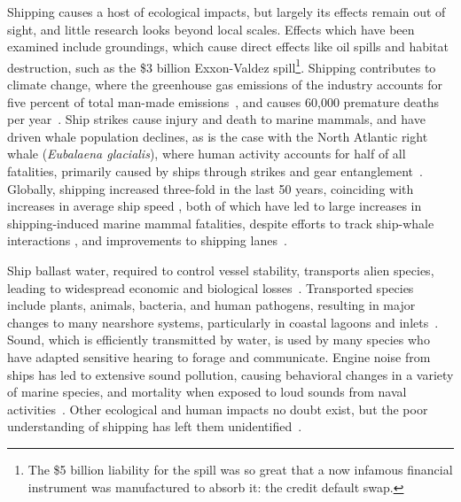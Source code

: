 Shipping causes a host of ecological impacts, but largely its effects remain out of sight, and little research looks beyond local scales. Effects which have been examined include groundings, which cause direct effects like oil spills and habitat destruction, such as the \$3 billion Exxon-Valdez spill\footnote{The \$5 billion liability for the spill was so great that a now infamous financial instrument was manufactured to absorb it: the credit default swap.}.  Shipping contributes to climate change, where the greenhouse gas emissions of the industry accounts for five percent of total man-made emissions~\citep{Eyring2009}, and causes 60,000 premature deaths per year~\citep{Corbett2007}.  Ship strikes cause injury and death to marine mammals, and have driven whale population declines, as is the case with the North Atlantic right whale (\textit{Eubalaena glacialis}), where human activity accounts for half of all fatalities, primarily caused by ships through strikes and gear entanglement~\citep{Moore2007}. Globally, shipping increased three-fold in the last 50 years, coinciding with increases in average ship speed \citep{Vanderlaan2009}, both of which have led to large increases in shipping-induced marine mammal fatalities, despite efforts to track ship-whale interactions \citep{jensen2004large}, and improvements to shipping lanes~\citep{Lagueux2011,Mckenna2012a}.

Ship ballast water, required to control vessel stability, transports alien species, leading to widespread economic and biological losses~\citep{Ruiz2000,Rodrigue2009}. Transported species include plants, animals, bacteria, and human pathogens, resulting in major changes to many nearshore systems, particularly in coastal lagoons and inlets~\citep{leppakoski2002baltic}.  Sound, which is efficiently transmitted by water, is used by many species who have adapted sensitive hearing to forage and communicate. Engine noise from ships has led to extensive sound pollution, causing behavioral changes in a variety of marine species, and mortality when exposed to loud sounds from naval activities~\citep{Hatch2009}. Other ecological and human impacts no doubt exist, but the poor understanding of shipping has left them unidentified~\citep{Davenport2006}.

